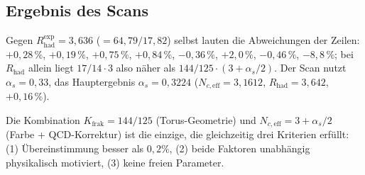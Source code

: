 	\subsection{Ergebnis des Scans}
	
	\begin{table}[h]
		\centering
		\caption{Ergebnis des systematischen Scans ($\alpha_s = 0{,}33$); die letzte Spalte ist die Abweichung des Lebensdauer-Verhältnisses $\tau_\mu/\tau_\tau$. Die Kombination $K_\text{frak} = 144/125$ mit $N_{c,\text{eff}} = 3 + \alpha_s/2$ liefert hier die beste Übereinstimmung.}
		\label{tab:scan}
	\end{table}
	Gegen $R_\text{had}^\text{exp} = 3{,}636$ ($= 64{,}79/17{,}82$) selbst lauten die Abweichungen der Zeilen: $+0{,}28\,\%$, $+0{,}19\,\%$, $+0{,}75\,\%$, $+0{,}84\,\%$, $-0{,}36\,\%$, $+2{,}0\,\%$, $-0{,}46\,\%$, $-8{,}8\,\%$; bei $R_\text{had}$ allein liegt $17/14 \cdot 3$ also näher als $144/125 \cdot (3+\alpha_s/2)$. Der Scan nutzt $\alpha_s = 0{,}33$, das Hauptergebnis $\alpha_s = 0{,}3224$ ($N_{c,\text{eff}} = 3{,}1612$, $R_\text{had} = 3{,}642$, $+0{,}16\,\%$).
	
	\begin{keypoint}
		Die Kombination $K_\text{frak} = 144/125$ (Torus-Geometrie) und $N_{c,\text{eff}} = 3 + \alpha_s/2$ (Farbe + QCD-Korrektur) ist die einzige, die gleichzeitig drei Kriterien erfüllt: (1) Übereinstimmung besser als $0{,}2\%$, (2) beide Faktoren unabhängig physikalisch motiviert, (3) keine freien Parameter.
	\end{keypoint}
	

